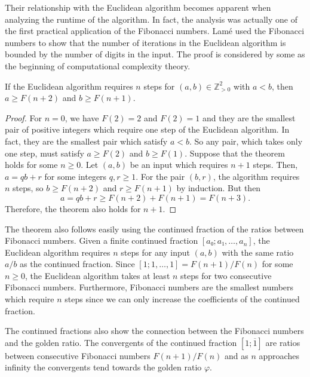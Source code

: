 Their relationship with the Euclidean algorithm becomes apparent when analyzing
the runtime of the algorithm.
In fact, the analysis was actually one of the first practical application of
the Fibonacci numbers.
Lamé \cite{Lame44} used the Fibonacci numbers to show that the number of
iterations in the Euclidean algorithm is bounded by the number of digits in the
input.
The proof is considered by some as the beginning of computational
complexity theory.

\begin{theorem}
  \label{thm:lame}
  If the Euclidean algorithm requires $n$ steps for $(a, b) ∈ ℤ_{> 0}^2$ with $a < b$,
  then $a ≥ F(n+2)$ and $b ≥ F(n+1)$.
\end{theorem}

\begin{proof}
  For $n = 0$, we have $F(2) = 2$ and $F(2) = 1$
  and they are the smallest pair of positive integers which require one step of
  the Euclidean algorithm.
  In fact, they are the smallest pair which satisfy $a < b$.
  So any pair, which takes only one step, must satisfy $a ≥ F(2)$ and $b ≥ F(1)$.
  Suppose that the theorem holds for some $n ≥ 0$.
  Let $(a, b)$ be an input which requires $n+1$ steps.
  Then, $a = qb + r$ for some integers $q, r ≥ 1$.
  For the pair $(b, r)$, the algorithm requires $n$ steps, so $b ≥ F(n+2)$ and
  $r ≥ F(n+1)$ by induction.
  But then
  \[
    a = qb + r ≥ F(n+2) + F(n+1) = F(n+3).
  \]
  Therefore, the theorem also holds for $n+1$.
\end{proof}

The theorem also follows easily using the continued fraction of the ratios
between Fibonacci numbers.
Given a finite continued fraction $[a₀; a₁, …, a_n]$, the Euclidean algorithm
requires $n$ steps for any input $(a, b)$ with the same ratio $a/b$ as the
continued fraction.
Since $[1; 1, …, 1] = F(n+1)/F(n)$ for some $n ≥ 0$, the Euclidean algorithm
takes at least $n$ steps for two consecutive Fibonacci numbers.
Furthermore, Fibonacci numbers are the smallest numbers which require $n$ steps
since we can only increase the coefficients of the continued fraction.

The continued fractions also show the connection between the Fibonacci numbers
and the golden ratio.
The convergents of the continued fraction $[1; \overline{1}]$ are ratios
between consecutive Fibonacci numbers $F(n+1)/F(n)$ and as $n$ approaches
infinity the convergents tend towards the golden ratio $φ$.

\iffalse
\begin{example}
  Consider $a = 13$ and $b = 8$.
  The algorithm proceeds as follows:
  \[
    \begin{array}{rclcrcl}
      13/8 & = & 1 & · & 5/8 & + & 3/8 \\
       5/8 & = & 1 & · & 3/8 & + & 2/8 \\
       3/8 & = & 1 & · & 2/8 & + & 1/8 \\
       2/8 & = & 2 & · & 1/8 & + & 0.
    \end{array}
  \]
\end{example}
\fi

